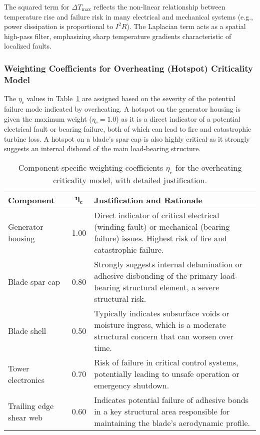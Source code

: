 \documentclass[energies,supfile,submit,pdftex,moreauthors]{Definitions/mdpi}
\begin{document}
The squared term for \(\Delta T_{\max}\) reflects the non-linear relationship between temperature rise and failure risk in many electrical and mechanical systems (e.g., power dissipation is proportional to \(I^2R\)). The Laplacian term acts as a spatial high-pass filter, emphasizing sharp temperature gradients characteristic of localized faults.

\subsubsection{Weighting Coefficients for Overheating (Hotspot) Criticality Model}
The \(\eta_c\) values in Table~\ref{tab:eta_coeff} are assigned based on the severity of the potential failure mode indicated by overheating. A hotspot on the generator housing is given the maximum weight (\(\eta_c = 1.0\)) as it is a direct indicator of a potential electrical fault or bearing failure, both of which can lead to fire and catastrophic turbine loss. A hotspot on a blade's spar cap is also highly critical as it strongly suggests an internal disbond of the main load-bearing structure.

\begin{table}[!htb]
\caption{Component-specific weighting coefficients \(\eta_c\) for the overheating criticality model, with detailed justification.}
\label{tab:eta_coeff}
\centering
\begin{tabularx}{\textwidth}{l c X}
\toprule
\textbf{Component} & \(\boldsymbol{\eta_c}\) & \textbf{Justification and Rationale} \\
\midrule
Generator housing   & 1.00 & Direct indicator of critical electrical (winding fault) or mechanical (bearing failure) issues. Highest risk of fire and catastrophic failure. \\
Blade spar cap      & 0.80 & Strongly suggests internal delamination or adhesive disbonding of the primary load-bearing structural element, a severe structural risk. \\
Blade shell         & 0.50 & Typically indicates subsurface voids or moisture ingress, which is a moderate structural concern that can worsen over time. \\
Tower electronics   & 0.70 & Risk of failure in critical control systems, potentially leading to unsafe operation or emergency shutdown. \\
Trailing edge shear web & 0.60 & Indicates potential failure of adhesive bonds in a key structural area responsible for maintaining the blade's aerodynamic profile. \\
\bottomrule
\end{tabularx}
\end{table}
\end{document}
